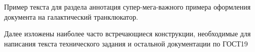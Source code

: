 \annotation

Пример текста для раздела аннотация супер-мега-важного примера оформления документа на галактический транклюкатор.

Далее изложены наиболее часто встречающиеся конструкции, необходимые для написания текста технического задания и остальной документации по ГОСТ19